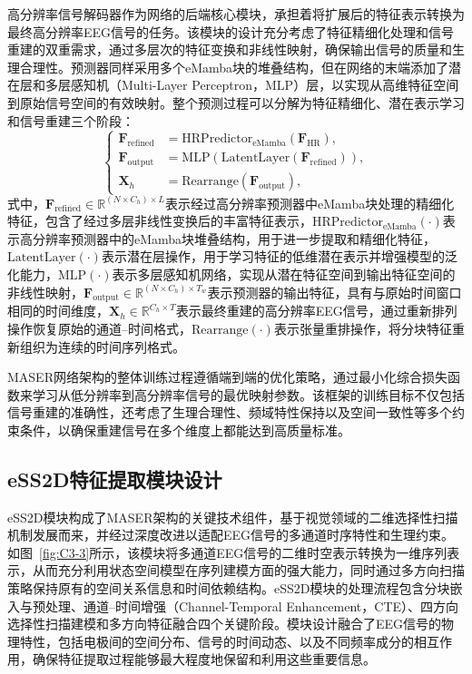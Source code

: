 高分辨率信号解码器作为网络的后端核心模块，承担着将扩展后的特征表示转换为最终高分辨率EEG信号的任务。该模块的设计充分考虑了特征精细化处理和信号重建的双重需求，通过多层次的特征变换和非线性映射，确保输出信号的质量和生理合理性。预测器同样采用多个eMamba块的堆叠结构，但在网络的末端添加了潜在层和多层感知机（Multi-Layer Perceptron，MLP）层，以实现从高维特征空间到原始信号空间的有效映射。整个预测过程可以分解为特征精细化、潜在表示学习和信号重建三个阶段：
\begin{equation}
\left\{
\begin{aligned}
\mathbf{F}_{\text{refined}} &= \mathrm{HRPredictor}_{\text{eMamba}}\!\left(\mathbf{F}_{\text{HR}}\right), \\
\mathbf{F}_{\text{output}} &= \mathrm{MLP}\!\left(\mathrm{LatentLayer}\!\left(\mathbf{F}_{\text{refined}}\right)\right), \\
\mathbf{X}_h &= \mathrm{Rearrange}\!\left(\mathbf{F}_{\text{output}}\right),
\end{aligned}
\right.
\label{eq:hr_prediction}
\end{equation}
式中，$\mathbf{F}_{\text{refined}} \in \mathbb{R}^{(N \times C_h) \times L}$表示经过高分辨率预测器中eMamba块处理的精细化特征，包含了经过多层非线性变换后的丰富特征表示，$\mathrm{HRPredictor}_{\text{eMamba}}(\cdot)$表示高分辨率预测器中的eMamba块堆叠结构，用于进一步提取和精细化特征，$\mathrm{LatentLayer}(\cdot)$表示潜在层操作，用于学习特征的低维潜在表示并增强模型的泛化能力，$\mathrm{MLP}(\cdot)$表示多层感知机网络，实现从潜在特征空间到输出特征空间的非线性映射，$\mathbf{F}_{\text{output}} \in \mathbb{R}^{(N \times C_h) \times T_w}$表示预测器的输出特征，具有与原始时间窗口相同的时间维度，$\mathbf{X}_h \in \mathbb{R}^{C_h \times T}$表示最终重建的高分辨率EEG信号，通过重新排列操作恢复原始的通道--时间格式，$\mathrm{Rearrange}(\cdot)$表示张量重排操作，将分块特征重新组织为连续的时间序列格式。

MASER网络架构的整体训练过程遵循端到端的优化策略，通过最小化综合损失函数来学习从低分辨率到高分辨率信号的最优映射参数。该框架的训练目标不仅包括信号重建的准确性，还考虑了生理合理性、频域特性保持以及空间一致性等多个约束条件，以确保重建信号在多个维度上都能达到高质量标准。

\subsection{eSS2D特征提取模块设计}
eSS2D模块构成了MASER架构的关键技术组件，基于视觉领域的二维选择性扫描机制发展而来，并经过深度改进以适配EEG信号的多通道时序特性和生理约束。如图~\ref{fig:C3-3}所示，该模块将多通道EEG信号的二维时空表示转换为一维序列表示，从而充分利用状态空间模型在序列建模方面的强大能力，同时通过多方向扫描策略保持原有的空间关系信息和时间依赖结构。eSS2D模块的处理流程包含分块嵌入与预处理、通道--时间增强（Channel-Temporal Enhancement，CTE）、四方向选择性扫描建模和多方向特征融合四个关键阶段。模块设计融合了EEG信号的物理特性，包括电极间的空间分布、信号的时间动态、以及不同频率成分的相互作用，确保特征提取过程能够最大程度地保留和利用这些重要信息。

